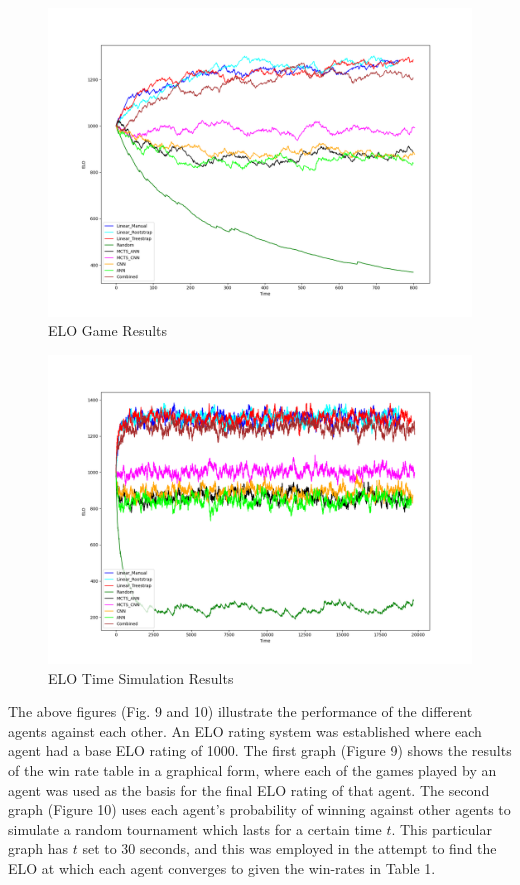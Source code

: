 \documentclass[a4paper,12pt,table]{article}
\begin{document}
\begin{figure}[H]
    \centering
    \includegraphics[width=\textwidth]{ELO_Game_Sim.png}
    \caption{ELO Game Results}
    \label{fig:}
\end{figure}

\begin{figure}[H]
    \centering
    \includegraphics[width=\textwidth]{ELO_Time_Sim.png}
    \caption{ELO Time Simulation Results}
    \label{fig:}
\end{figure}


The above figures (Fig. 9 and 10) illustrate the performance of the different agents against each other. An ELO rating system was established where each agent had a base ELO rating of 1000. The  first graph (Figure 9) shows the results of the win rate table in a graphical form, where each of the games played by an agent was used as the basis for the final ELO rating of that agent. The second graph (Figure 10) uses each agent's probability of winning against other agents to simulate a random tournament which lasts for a certain time $t$. This particular graph has $t$ set to 30 seconds, and this was employed in the attempt to  find the ELO at which each agent converges to given the win-rates in Table 1. \par
\end{document}
